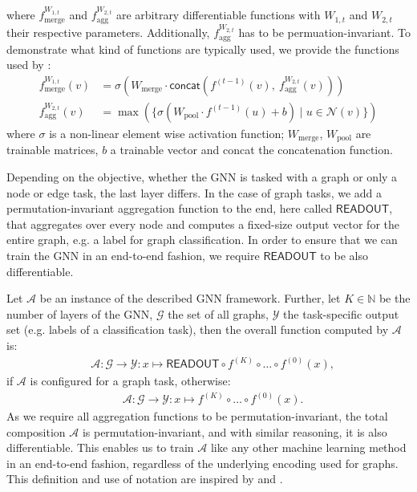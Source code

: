 \documentclass[11pt, dvipsnames, DIV=12]{scrreprt}
\theoremstyle{definition}
\begin{document}
\noindent where $f^{W_{1,t}}_{\text{merge}}$ and $f^{W_{2,t}}_{\text{agg}}$ are arbitrary differentiable functions with $W_{1,t}$ and $W_{2,t}$ their respective parameters. Additionally, $f^{W_{2,t}}_{\text{agg}}$ has to be permuation-invariant. To demonstrate what kind of functions are typically used, we provide the functions used by \cite{Ham+2017}:
\begin{align*}
    f^{W_{1,t}}_{\text{merge}}(v) &= \sigma (W_{\text{merge}} \cdot \textsf{concat}(f^{(t-1)}(v), \ f^{W_{2,t}}_{\text{agg}}(v)))\\
    f^{W_{2,t}}_{\text{agg}}(v) &= \max(\{ \sigma(W_{\text{pool}} \cdot f^{(t-1)}(u) + b) \mid u \in \mathcal{N}(v)\})
\end{align*}
\noindent where $\sigma$ is a non-linear element wise activation function; $W_{\text{merge}}$, $W_{\text{pool}}$ are trainable matrices, $b$ a trainable vector and \textsf{concat} the concatenation function.

Depending on the objective, whether the GNN is tasked with a graph or only a node or edge task, the last layer differs. In the case of graph tasks, we add a permutation-invariant aggregation function to the end, here called $\textsf{READOUT}$, that aggregates over every node and computes a fixed-size output vector for the entire graph, e.g. a label for graph classification. In order to ensure that we can train the GNN in an end-to-end fashion, we require $\textsf{READOUT}$ to be also differentiable.

Let $\mathcal{A}$ be an instance of the described GNN framework. Further, let $K \in \mathbb{N}$ be the number of layers of the GNN, $\mathcal{G}$ the set of all graphs, $\mathcal{Y}$ the task-specific output set (e.g. labels of a classification task), then the overall function computed by $\mathcal{A}$ is:
\begin{align*}
    &\mathcal{A}: \mathcal{G} \rightarrow \mathcal{Y}: x \mapsto \textsf{READOUT} \circ f^{(K)} \circ \ldots \circ f^{(0)}(x),
\end{align*}
if $\mathcal{A}$ is configured for a graph task, otherwise:
\begin{align*}
    &\mathcal{A}: \mathcal{G} \rightarrow \mathcal{Y}: x \mapsto f^{(K)} \circ \ldots \circ f^{(0)}(x).
\end{align*}
As we require all aggregation functions to be permutation-invariant, the total composition $\mathcal{A}$ is permutation-invariant, and with similar reasoning, it is also differentiable. This enables us to train $\mathcal{A}$ like any other machine learning method in an end-to-end fashion, regardless of the underlying encoding used for graphs. This definition and use of notation are inspired by \cite{Morris2018} and \cite{Xu2018}.
\end{document}
